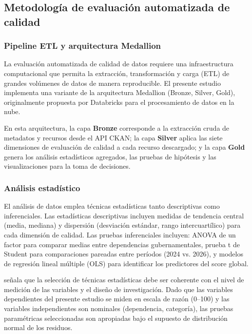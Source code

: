 \documentclass[12pt,letterpaper]{article}
\begin{document}
\subsection{Metodología de evaluación automatizada de calidad}

\subsubsection{Pipeline ETL y arquitectura Medallion}

La evaluación automatizada de calidad de datos requiere una infraestructura computacional que permita la extracción, transformación y carga (ETL) de grandes volúmenes de datos de manera reproducible. El presente estudio implementa una variante de la arquitectura Medallion (Bronze, Silver, Gold), originalmente propuesta por Databricks para el procesamiento de datos en la nube.

En esta arquitectura, la capa \textbf{Bronze} corresponde a la extracción cruda de metadatos y recursos desde el API CKAN; la capa \textbf{Silver} aplica las siete dimensiones de evaluación de calidad a cada recurso descargado; y la capa \textbf{Gold} genera los análisis estadísticos agregados, las pruebas de hipótesis y las visualizaciones para la toma de decisiones.

\subsubsection{Análisis estadístico}

El análisis de datos emplea técnicas estadísticas tanto descriptivas como inferenciales. Las estadísticas descriptivas incluyen medidas de tendencia central (media, mediana) y dispersión (desviación estándar, rango intercuartílico) para cada dimensión de calidad. Las pruebas inferenciales incluyen: ANOVA de un factor para comparar medias entre dependencias gubernamentales, prueba t de Student para comparaciones pareadas entre períodos (2024 vs. 2026), y modelos de regresión lineal múltiple (OLS) para identificar los predictores del score global.

\textcite{rojas2013} señala que la selección de técnicas estadísticas debe ser coherente con el nivel de medición de las variables y el diseño de investigación. Dado que las variables dependientes del presente estudio se miden en escala de razón (0--100) y las variables independientes son nominales (dependencia, categoría), las pruebas paramétricas seleccionadas son apropiadas bajo el supuesto de distribución normal de los residuos.
\end{document}
